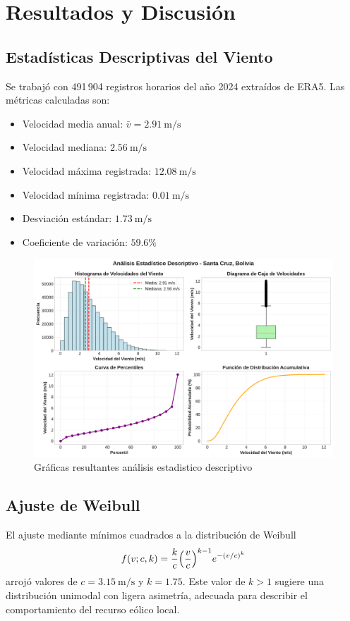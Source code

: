 \documentclass[a4paper,12pt]{article}
\begin{document}
	\section{Resultados y Discusión}
	
	\subsection{Estadísticas Descriptivas del Viento}
	Se trabajó con 491\,904 registros horarios del año 2024 extraídos de ERA5. Las métricas calculadas son:
	\begin{itemize}
		\item Velocidad media anual: $\bar v = 2.91\ \mathrm{m/s}$
		\item Velocidad mediana: $2.56\ \mathrm{m/s}$
		\item Velocidad máxima registrada: $12.08\ \mathrm{m/s}$
		\item Velocidad mínima registrada: $0.01\ \mathrm{m/s}$
		\item Desviación estándar: $1.73\ \mathrm{m/s}$
		\item Coeficiente de variación: $59.6\%$
	\end{itemize}
	
	
	\begin{figure}[H]
		\centering
		\includegraphics[width=1.0\textwidth]{estadisticas_descriptivas.pdf}
		\caption{Gráficas resultantes análisis estadistico descriptivo}
		\label{fig:estadistica}
	\end{figure}
	
	\subsection{Ajuste de Weibull}
	El ajuste mediante mínimos cuadrados a la distribución de Weibull
	\[
	f(v;c,k)=\frac{k}{c}\Bigl(\frac{v}{c}\Bigr)^{k-1}e^{-(v/c)^k}
	\]
	arrojó valores de $c=3.15\ \mathrm{m/s}$ y $k=1.75$. Este valor de $k>1$ sugiere una distribución unimodal con ligera asimetría, adecuada para describir el comportamiento del recurso eólico local.
	
\end{document}
